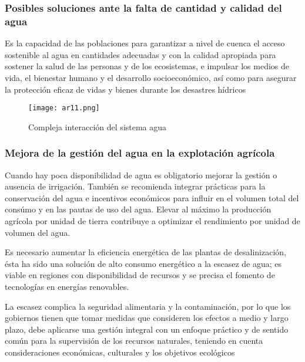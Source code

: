 \subsubsection{Posibles soluciones ante la falta de cantidad y calidad del agua}
\begin{definition}
  Es la capacidad de las poblaciones para garantizar a nivel de cuenca el acceso sostenible al agua en cantidades adecuadas y con la calidad apropiada para sostener la salud de las personas y de los ecosistemas, e impulsar los medios de vida, el bienestar humano y el desarrollo socioeconómico, así como para asegurar la protección eficaz de vidas y bienes durante los desastres hídricos
\end{definition}
\begin{center}
  \end{center}
\begin{figure}[h!]
\centering
  \texttt{[image: ar11.png]}
  \caption{Compleja interacción del sistema agua\cite{bogardi2016water}}
  \label{ar11}
\end{figure}
\subsubsection{Mejora de la gestión del agua en la explotación agrícola}
Cuando hay poca disponibilidad de agua es obligatorio mejorar la gestión o ausencia de irrigación. También se recomienda integrar prácticas para la conservación del agua e incentivos económicos para influir en el volumen total del consúmo y en las pautas de uso del agua. Elevar al máximo la producción agrícola por unidad de tierra contribuye a optimizar el rendimiento por unidad de volumen del agua.

Es necesario aumentar la eficiencia energética de las plantas de desalinización, ésta ha sido una solución de alto consumo energético a la escasez de agua; es viable en regiones con disponibilidad de recursos y se precisa el fomento de tecnologías en energías renovables.

La escasez complica la seguridad alimentaria y la contaminación, por lo que los gobiernos tienen que tomar medidas que consideren los efectos a medio y largo plazo, debe aplicarse una gestión integral con un enfoque práctico y de sentido común para la supervisión de los recursos naturales, teniendo en cuenta consideraciones económicas, culturales y los objetivos ecológicos

